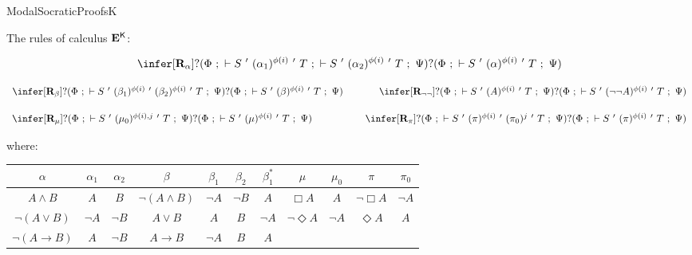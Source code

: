 \begin{entry}{ModalSocraticProofsK}  

\begin{calculus}
The rules of calculus $\mathbf{E}^\mathsf{K}$:

$$
\infer[\mathbf{R}_\alpha]{?(\Phi ~;~ \vdash S ~'~ (\alpha_1)^{\phi(i)} ~'~ T ~;~ \vdash S ~'~ (\alpha_2)^{\phi(i)} ~'~ T ~;~ \Psi)}{?(\Phi ~;~ \vdash S ~'~ (\alpha)^{\phi(i)} ~'~ T ~;~ \Psi)}
$$

\vspace{-0.3cm}

\[
\begin{array}{ccc}
\infer[\mathbf{R}_\beta]{?(\Phi ~;~ \vdash S ~'~ (\beta_1)^{\phi(i)} ~'~(\beta_2)^{\phi(i)} ~'~ T ~;~ \Psi)}{?(\Phi ~;~ \vdash S ~'~ (\beta)^{\phi(i)} ~'~ T ~;~ \Psi)}
&~~~~~&
\infer[\mathbf{R}_{\lnot \lnot}]{?(\Phi ~;~ \vdash S ~'~ (A)^{\phi(i)} ~'~ T ~;~ \Psi)}{?(\Phi ~;~ \vdash S ~'~ (\lnot \lnot A)^{\phi(i)} ~'~ T ~;~ \Psi)}
\end{array}
\]

\vspace{-0.4cm}

\[
\begin{array}{ccc}
\infer[\mathbf{R}_\mu]{?(\Phi ~;~ \vdash S ~'~ (\mu_0)^{\phi(i),j} ~'~ T ~;~ \Psi)}{?(\Phi ~;~ \vdash S ~'~ (\mu)^{\phi(i)} ~'~ T ~;~ \Psi)}
&~~~~~~~~~~&
\infer[\mathbf{R}_\pi]{?(\Phi ~;~ \vdash S ~'~ (\pi)^{\phi(i)} ~'~ (\pi_0)^{j} ~'~ T ~;~ \Psi)}{?(\Phi ~;~ \vdash S ~'~ (\pi)^{\phi(i)} ~'~ T ~;~ \Psi)}
\end{array}
\]

where:

\begin{center}
	\begin{tabular}{ccc|cccc|cc|cc}
			\hline 
		$\alpha$ & $\alpha_{1}$ & $\alpha_{2}$ & $\beta$ & $\beta_{1}$ & $\beta_{2}$ & $\beta^{*}_{1}$ & $\mu$ & $\mu_0$ & $\pi$ & $\pi_0$ \\ 
			\hline
		$\textit{A}\wedge B$ & $\textit{A}$ & $\textit{B}$ & $\neg(A\wedge B)$ & $\neg A$ & $\neg B$ & $A$ & $\Box A$ & $A$ & $\lnot \Box A$ & $\lnot A$ \\
			
		$\neg(A\vee B)$ & $\neg A$ & $\neg B$ & $\textit{A}\vee B$ & $\textit{A}$ & $\textit{B}$ & $\neg A$ & $\lnot \Diamond A$ & $\lnot A$ & $\Diamond A$ & $A$ \\
			
		$\neg(A \rightarrow B)$ & $\textit{A}$ & $\neg B$ & $\textit{A} \rightarrow B$ & $\neg A$ & $\textit{B}$ & $A$ \\
			\hline 
	\end{tabular}


\end{center}
\end{calculus}
\end{entry}
